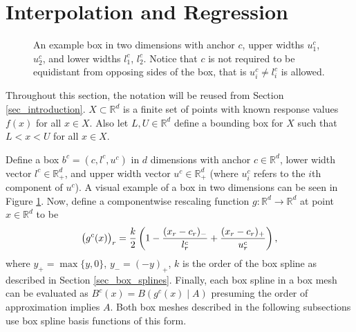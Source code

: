 \section{Interpolation and Regression}
\label{sec_mesh_construction}

\begin{figure}
  \centering
  \caption{An example box in two dimensions with anchor $c$, upper widths $u^c_1$, $u^c_2$, and lower widths $l^c_1$, $l^c_2$. Notice that $c$ is not required to be equidistant from opposing sides of the box, that is $u^c_i \not= l^c_i$ is allowed.}
  \label{fig_example_box}
\end{figure}

Throughout this section, the notation will be reused from Section \ref{sec_introduction}. $X \subset \mathbb{R}^d$ is a finite set of points with known response values $f(x)$ for all $x \in X$. Also let $L,U \in \mathbb{R}^d$ define a bounding box for $X$ such that $L < x < U$ for all $x \in X$.

Define a box $b^c = (c,l^c,u^c)$ in $d$ dimensions with anchor $c \in \mathbb{R}^d$, lower width vector $l^c \in \mathbb{R}^d_+$, and upper width vector $u^c \in \mathbb{R}^d_+$ (where $u^c_i$ refers to the $i$th component of $u^c$). A visual example of a box in two dimensions can be seen in Figure \ref{fig_example_box}. Now, define a componentwise rescaling function $g: \mathbb{R}^d \rightarrow \mathbb{R}^d$ at point $x \in \mathbb{R}^d$ to be
\begin{equation}
  \bigl(g^c(x)\bigr)_r = {k \over 2} \left( 1 - {(x_r - c_r)_- \over l^c_r} + {(x_r - c_r)_+ \over u^c_r} \right),
\end{equation}
where $y_+=\max\{y,0\}$, $y_-=(-y)_+$, $k$ is the order of the box spline as described in Section \ref{sec_box_splines}. Finally, each box spline in a box mesh can be evaluated as $B^c(x) = B(g^c(x) \mid A)$ presuming the order of approximation implies $A$. Both box meshes described in the following subsections use box spline basis functions of this form.

